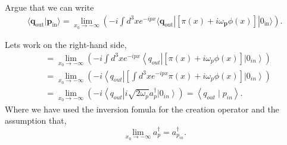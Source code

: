\documentclass[working, oneside]{../../Preambles/tuftebook}
\begin{document}
\begin{exercise}[3]
Argue that we can write
\begin{align*}
\langle \mathbf{q}_{\text{out}} | \mathbf{p}_{\text{in}} \rangle = \lim_{x_0 \to -\infty} \left( -i \int d^3x e^{-ipx} \langle \mathbf{q}_{\text{out}} | \left[ \pi(x) + i \omega_\mathbf{p} \phi(x) \right] | 0_{\text{in}} \rangle \right). \tag{91}
\end{align*}
\end{exercise}
\begin{solution}
Lets work on the right-hand side,
\begin{align*}
    &= \lim_{x_0 \to -\infty} \left( -i\int d^{3}x e^{-ipx}\left<q_{out} \right|\left[ \pi\left( x \right) + i\omega_p \phi \left( x \right) \right] \left|0_{in} \right> \right)  \\
    &= \lim_{x_0 \to -\infty} \left( -i\left<q_{out} \right|\left[ \int d^{3}x e^{-ipx}\pi\left( x \right) + i\omega_p \phi \left( x \right) \right] \left|0_{in} \right> \right)  \\
    &= \lim_{x_0 \to -\infty} \left( -i\left<q_{out} \right|i\sqrt{2\omega_p} a^\dagger_{p} \left|0_{in} \right> \right)  = \left<q_{out} \mid p_{in} \right>
.\end{align*}
Where we have used the inversion fomula for the creation operator and the assumption that,
\[
\lim_{x_0 \to -\infty} a_p^\dagger = a_{p_{in}}^\dagger
.\] 
\end{solution}
\end{document}
